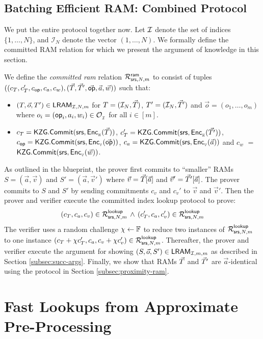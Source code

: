 \subsection{Batching Efficient RAM: Combined Protocol}\label{subsec:all-together}
We put the entire protocol together now. Let $\mathcal{I}$ denote the set of indices $\{1,\ldots,N\}$, and $\mathcal{I}_N$
denote the vector $(1,\ldots,N)$. We formally define the committed RAM relation for which we present the argument of
knowledge in this section.
\begin{definition}\label{defn:committed-ram}
We define the {\em committed ram} relation
$\mathcal{R}^{\mathsf{ram}}_{\mathsf{srs},N,m}$ to consist of tuples $((c_T, c_T', c_{\mathsf{op}}, c_a, c_w),(\vec{T}, \vec{T}',\vec{\mathsf{op}},\vec{a},\vec{w}))$
such that:
\begin{itemize}[leftmargin=1em]
\item $(T,\vec{o},T')\in \mathsf{LRAM}_{\mathcal{I},N,m}$ for $T=(\mathcal{I}_N,\vec{T})$, $T'=(\mathcal{I}_N,\vec{T}')$ and $\vec{o}=(o_1,\ldots,o_m)$
where $o_i=(\mathsf{op}_i, a_i, w_i)\in \mathcal{O}_{{}_\mathcal{I}}$ for all $i\in [m]$.
\item $c_T=\mathsf{KZG.Commit}(\mathsf{srs},\mathsf{Enc}_{{}_{\mathbb{H}}}(\vec{T}))$, $c_T'=\mathsf{KZG.Commit}(\mathsf{srs},\mathsf{Enc}_{{}_{\mathbb{H}}}(\vec{T'}))$, $c_{\mathsf{op}}=\mathsf{KZG.Commit}(\mathsf{srs},\mathsf{Enc}_{{}_{\mathbb{V}}}(\vec{\mathsf{op}}))$,
$c_a=\mathsf{KZG.Commit}(\mathsf{srs},\mathsf{Enc}_{{}_{\mathbb{V}}}(\vec{a}))$ and $c_w$ $=$ \\ $\mathsf{KZG.Commit}(\mathsf{srs},\mathsf{Enc}_{{}_{\mathbb{V}}}(\vec{w}))$.
\end{itemize}
\end{definition}
As outlined in the blueprint, the prover first commits to ``smaller'' RAMs $S=(\vec{a},\vec{v})$ and $S'=(\vec{a},\vec{v}')$
where $\vec{v}=\vec{T}[\vec{a}]$ and $\vec{v}'=\vec{T}'[\vec{a}]$. The prover commits to $S$ and $S'$ by sending commitments
$c_v$ and $c_v'$ to $\vec{v}$ and $\vec{v}'$. Then the prover and verifier execute the committed index lookup protocol to
prove:
\begin{equation}
(c_T, c_a, c_v)\in \mathcal{R}^{\mathsf{lookup}}_{\mathsf{srs},N,m}\, \wedge\, (c_T', c_a, c_v')\in \mathcal{R}^{\mathsf{lookup}}_{\mathsf{srs},N,m}
\end{equation}
The verifier uses a random challenge $\chi\gets \mathbb{F}$ to reduce two instances of $\mathcal{R}^{\mathsf{lookup}}_{\mathsf{srs},N,m}$ to one instance
$(c_T + \chi c_T', c_a, c_v + \chi c_v')\in \mathcal{R}^{\mathsf{lookup}}_{\mathsf{srs},N,m}$. Thereafter, the prover and verifier execute the argument for
showing $(S,\vec{o},S')\in \mathsf{LRAM}_{\mathcal{I},m,m}$ as described in Section \ref{subsec:succ-args}. Finally, we show that
RAMs $\vec{T}$ and $\vec{T}'$ are $\vec{a}$-identical using the protocol in Section \ref{subsec:proximity-ram}.

\section{Fast Lookups from Approximate Pre-Processing}\label{sec:update-protocol}














